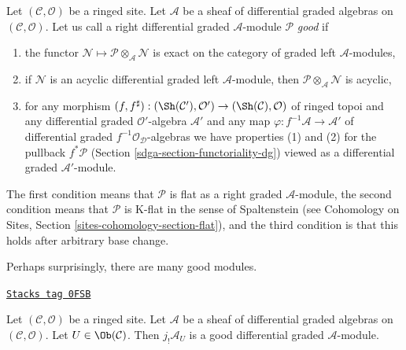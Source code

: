 \medskip\noindent
Let $(\mathcal{C}, \mathcal{O})$ be a ringed site.
Let $\mathcal{A}$ be a sheaf of differential graded algebras
on $(\mathcal{C}, \mathcal{O})$. Let us call a right differential
graded $\mathcal{A}$-module $\mathcal{P}$ {\it good}
if
\begin{enumerate}
\item the functor
$\mathcal{N} \mapsto \mathcal{P} \otimes_\mathcal{A} \mathcal{N}$
is exact on the category of graded left $\mathcal{A}$-modules,
\item if $\mathcal{N}$ is an acyclic differential graded left
$\mathcal{A}$-module, then
$\mathcal{P} \otimes_\mathcal{A} \mathcal{N}$ is acyclic,
\item for any morphism $(f, f^\sharp) : (\Sh(\mathcal{C}'), \mathcal{O}')
\to (\Sh(\mathcal{C}), \mathcal{O})$
of ringed topoi and any differential graded $\mathcal{O}'$-algebra
$\mathcal{A}'$ and any map $\varphi : f^{-1}\mathcal{A} \to \mathcal{A}'$
of differential graded $f^{-1}\mathcal{O}_\mathcal{D}$-algebras we have
properties (1) and (2) for the pullback $f^*\mathcal{P}$
(Section \ref{sdga-section-functoriality-dg})
viewed as a differential graded $\mathcal{A}'$-module.
\end{enumerate}
The first condition means that $\mathcal{P}$ is flat as a right graded
$\mathcal{A}$-module, the second condition means that $\mathcal{P}$ is
K-flat in the sense of Spaltenstein (see
Cohomology on Sites, Section \ref{sites-cohomology-section-flat}), and
the third condition is that this holds after arbitrary base change.

\medskip\noindent
Perhaps surprisingly, there are many good modules.

\begin{lemma}
\label{sdga-lemma-supply-good}
\href{https://stacks.math.columbia.edu/tag/0FSB}{\texttt{Stacks tag 0FSB}}

Let $(\mathcal{C}, \mathcal{O})$ be a ringed site.
Let $\mathcal{A}$ be a sheaf of differential graded algebras
on $(\mathcal{C}, \mathcal{O})$. Let $U \in \Ob(\mathcal{C})$.
Then $j_!\mathcal{A}_U$ is a good differential graded
$\mathcal{A}$-module.
\end{lemma}

